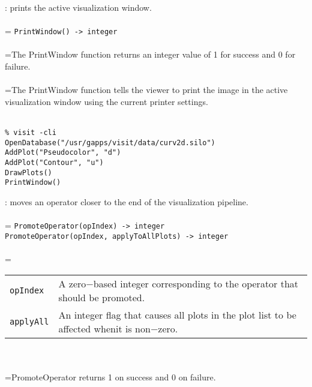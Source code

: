\documentclass[10pt,a4paper]{report}
\begin{document}
{}
: prints the active visualization window.\\[-3mm]

 \\ 
\hangindent=\parindent 
\verb!PrintWindow() -> integer!\\ [-3mm]

 \\ 
\hangindent=\parindent The PrintWindow function returns an integer value of 1 for success and 0 for failure. \\[-3mm] 

 \\ 
\hangindent=\parindent The PrintWindow function tells the viewer to print the image in the active visualization window using the current printer settings. \\[-3mm] 

\\[-6mm]
\begin{verbatim}% visit -cli
OpenDatabase("/usr/gapps/visit/data/curv2d.silo")
AddPlot("Pseudocolor", "d")
AddPlot("Contour", "u")
DrawPlots()
PrintWindow()
\end{verbatim}
\newpage


{}
: moves an operator closer to the end of the visualization pipeline.\\[-3mm]

 \\ 
\hangindent=\parindent 
\verb!PromoteOperator(opIndex) -> integer!\\ 
\verb!PromoteOperator(opIndex, applyToAllPlots) -> integer!\\ [-3mm]

 \\ 
\hangindent=\parindent 
\begin{tabular}{lp{9cm}}
\verb!opIndex! & A zero$-$based integer corresponding to the operator that should be promoted. \\
\verb!applyAll! & An integer flag that causes all plots in the plot list to be affected whenit is non$-$zero. \\
\end{tabular} \\[-2mm]


 \\ 
\hangindent=\parindent PromoteOperator returns 1 on success and 0 on failure. \\[-3mm] 
\end{document}
